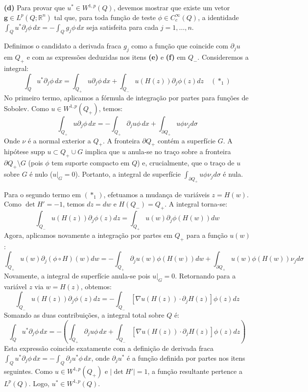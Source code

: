 \documentclass[cs_edp_2026.1.tex]{subfiles} %
\begin{document}
{	\textbf{(d)} Para provar que $u^* \in W^{1,p}(Q)$, devemos mostrar que existe um vetor $\mathbf{g} \in L^p(Q; \mathbb{R}^n)$ tal que, para toda função de teste $\phi \in C_c^\infty(Q)$, a identidade $\int_Q u^* \partial_j \phi \, dx = - \int_Q g_j \phi \, dx$ seja satisfeita para cada $j=1, \dots, n$.
	
	Definimos o candidato a derivada fraca $g_j$ como a função que coincide com $\partial_j u$ em $Q_+$ e com as expressões deduzidas nos itens \textbf{(e)} e \textbf{(f)} em $Q_-$. Consideremos a integral:
	$$\int_Q u^* \partial_j \phi \, dx = \int_{Q_+} u \partial_j \phi \, dx + \int_{Q_-} u(H(z)) \partial_j \phi(z) dz \quad (\ast_1)$$
	No primeiro termo, aplicamos a fórmula de integração por partes para funções de Sobolev. Como $u \in W^{1,p}(Q_+)$, temos:
	$$\int_{Q_+} u \partial_j \phi \, dx = - \int_{Q_+} \partial_j u \phi \, dx + \int_{\partial Q_+} u \phi \nu_j d\sigma$$
	Onde $\nu$ é a normal exterior a $Q_+$. A fronteira $\partial Q_+$ contém a superfície $G$. A hipótese $\text{supp } u \subset Q_+ \cup G$ implica que $u$ anula-se no traço sobre a fronteira $\partial Q_+ \setminus G$ (pois $\phi$ tem suporte compacto em $Q$) e, crucialmente, que o traço de $u$ sobre $G$ é nulo ($u|_G = 0$). Portanto, a integral de superfície $\int_{\partial Q_+} u \phi \nu_j d\sigma$ é nula.
	
	Para o segundo termo em $(\ast_1)$, efetuamos a mudança de variáveis $z = H(w)$. Como $\det H' = -1$, temos $dz = dw$ e $H(Q_-) = Q_+$. A integral torna-se:
	$$\int_{Q_-} u(H(z)) \partial_j \phi(z) dz = \int_{Q_+} u(w) \partial_j \phi(H(w)) dw$$
	Agora, aplicamos novamente a integração por partes em $Q_+$ para a função $u(w)$:
	$$\int_{Q_+} u(w) \partial_j (\phi \circ H)(w) dw = - \int_{Q_+} \partial_j u(w) \phi(H(w)) dw + \int_{\partial Q_+} u(w) \phi(H(w)) \nu_j d\sigma$$
	Novamente, a integral de superfície anula-se pois $u|_G = 0$. Retornando para a variável $z$ via $w = H(z)$, obtemos:
	$$\int_{Q_-} u(H(z)) \partial_j \phi(z) dz = - \int_{Q_-} \left[ \nabla u(H(z)) \cdot \partial_j H(z) \right] \phi(z) dz$$
	Somando as duas contribuições, a integral total sobre $Q$ é:
	$$\int_Q u^* \partial_j \phi \, dx = - \left( \int_{Q_+} \partial_j u \phi \, dx + \int_{Q_-} \left[ \nabla u(H(z)) \cdot \partial_j H(z) \right] \phi(z) dz \right)$$
	Esta expressão coincide exatamente com a definição de derivada fraca $\int_Q u^* \partial_j \phi \, dx = - \int_Q \partial_j u^* \phi \, dx$, onde $\partial_j u^*$ é a função definida por partes nos itens seguintes. Como $u \in W^{1,p}(Q_+)$ e $|\det H'|=1$, a função resultante pertence a $L^p(Q)$. Logo, $\boxed{u^* \in W^{1,p}(Q)}$.
	
}
\end{document}
